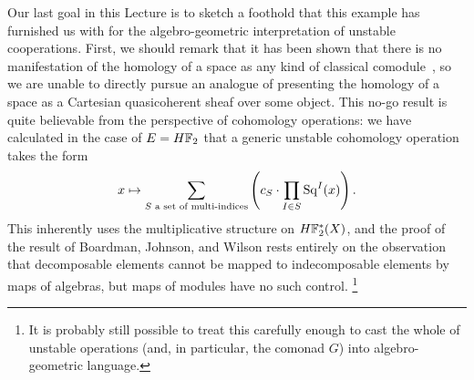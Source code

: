 Our last goal in this Lecture is to sketch a foothold that this example has furnished us with for the algebro-geometric interpretation of unstable cooperations.
First, we should remark that it has been shown that there is no manifestation of the homology of a space as any kind of classical comodule~\cite[Theorem 9.4]{BJW}, so we are unable to directly pursue an analogue of  presenting the homology of a space as a Cartesian quasicoherent sheaf over some object.
This no-go result is quite believable from the perspective of cohomology operations: we have calculated in the case of \(E = \HFtwo\) that a generic unstable cohomology operation takes the form \[x \mapsto \sum_{\text{\(S\) a set of multi-indices}} \left(c_S \cdot \prod_{I \in S} \operatorname{Sq}^I(x)\right).\]
This inherently uses the multiplicative structure on \(\HFtwo^*(X)\), and the proof of the result of Boardman, Johnson, and Wilson rests entirely on the observation that decomposable elements cannot be mapped to indecomposable elements by maps of algebras, but maps of modules have no such control.%
\footnote{%
It is probably still possible to treat this carefully enough to cast the whole of unstable operations (and, in particular, the comonad \(G\)) into algebro-geometric language.
}

